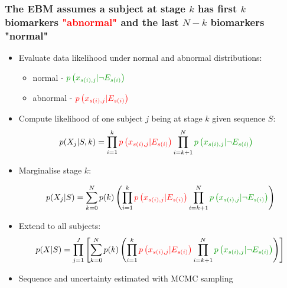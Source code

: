 \documentclass[8pt,xcolor=table]{beamer}
\begin{document}
\begin{frame}[label=current]
\frametitle{The EBM assumes a subject at stage $k$ has first $k$ biomarkers \textcolor{red}{"abnormal"} and the last $N-k$ biomarkers \textcolor{green!60!black}{"normal"}}

\begin{itemize}

 \item Evaluate data likelihood under normal and abnormal distributions:
 \begin{itemize}
  \item normal - $\textcolor{green!60!black}{ p\left(x_{s(i),j} | \neg E_{s(i)}\right) }$
  \item abnormal - $\textcolor{red}{p\left(x_{s(i),j} | E_{s(i)} \right)}$
 \end{itemize}
 
 \item Compute likelihood of one subject $j$ being at stage $k$ given sequence $S$:
 \begin{align*}
& p(X_j|S,k) = \prod_{i=1}^k \textcolor{red}{p\left(x_{s(i),j} | E_{s(i)} \right)} \prod_{i=k+1}^N \textcolor{green!60!black}{ p\left(x_{s(i),j} | \neg E_{s(i)}\right) } 
 \end{align*}

 
 \item Marginalise stage $k$:
 
 $$p(X_j|S) =  \sum_{k=0}^N p(k) \left( \prod_{i=1}^k \textcolor{red}{p\left(x_{s(i),j} | E_{s(i)} \right)} \prod_{i=k+1}^N \textcolor{green!60!black}{ p\left(x_{s(i),j} | \neg E_{s(i)}\right) } \right) $$
  
 \item Extend to all subjects:
$$p(X|S) = \prod_{j=1}^J \left[ \sum_{k=0}^N p(k) \left( \prod_{i=1}^k \textcolor{red}{p\left(x_{s(i),j} | E_{s(i)} \right)} \prod_{i=k+1}^N \textcolor{green!60!black}{ p\left(x_{s(i),j} | \neg E_{s(i)}\right) } \right) \right]$$

 \item Sequence and uncertainty estimated with MCMC sampling
\end{itemize}

\end{frame}


\newcommand{\scaleBrainImg}{0.15}
\newcommand{\scaleAllSubfigsImg}{0.3}
\end{document}
